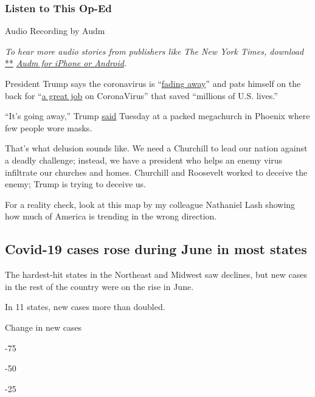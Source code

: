 \hypertarget{listen-to-this-op-ed}{%
\subsubsection{Listen to This Op-Ed}\label{listen-to-this-op-ed}}

Audio Recording by Audm

\emph{To hear more audio stories from publishers like The New York
Times, download}
\href{https://www.audm.com/?utm_source=nytmag\&utm_medium=embed\&utm_campaign=left_behind_draper}{**}
\href{https://www.audm.com/?utm_source=nytopinion\&utm_medium=embed\&utm_campaign=trump_coronavirus_nightmare}{\emph{Audm
for iPhone or Android}}\emph{.}

President Trump says the coronavirus is
``\href{https://time.com/5855541/trump-coronavirus-fade-away/}{fading
away}'' and pats himself on the back for
``\href{https://twitter.com/realDonaldTrump/status/1275438921552257026}{a
great job} on CoronaVirus'' that saved ``millions of U.S. lives.''

``It's going away,'' Trump
\href{https://www.politico.com/news/2020/06/23/trump-rally-arizona-336565}{said}
Tuesday at a packed megachurch in Phoenix where few people wore masks.

That's what delusion sounds like. We need a Churchill to lead our nation
against a deadly challenge; instead, we have a president who helps an
enemy virus infiltrate our churches and homes. Churchill and Roosevelt
worked to deceive the enemy; Trump is trying to deceive us.

For a reality check, look at this map by my colleague Nathaniel Lash
showing how much of America is trending in the wrong direction.

\hypertarget{covid-19-cases-rose-during-june-in-most-states}{%
\subsection{Covid-19 cases rose during June in most
states}\label{covid-19-cases-rose-during-june-in-most-states}}

The hardest-hit states in the Northeast and Midwest saw declines, but
new cases in the rest of the country were on the rise in June.

In 11 states, new cases more than doubled.

Change in new cases

-75

-50

-25

